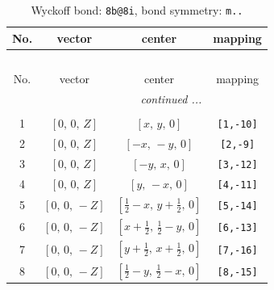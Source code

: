 \documentclass[fleqn,8pt]{jsarticle}
\begin{document}
\begin{longtable}{cccc}
\caption{Wyckoff bond: {\tt 8b@8i}, bond symmetry: {\tt m..}}
 \\
 \hline \hline
No. & vector & center & mapping \\ \hline \endfirsthead

\multicolumn{3}{l}{\tablename\ \thetable{}} \\
 \hline \hline
No. & vector & center & mapping \\ \hline \endhead

 \hline \hline
\multicolumn{3}{r}{\footnotesize\it continued ...} \\ \endfoot

 \hline \hline
\multicolumn{3}{r}{} \\ \endlastfoot

1 & $\left[ 0,\, 0,\, Z \right]$ & $\left[ x,\, y,\, 0 \right]$ & {\tt [1,-10]} \\ \hline
2 & $\left[ 0,\, 0,\, Z \right]$ & $\left[ - x,\, - y,\, 0 \right]$ & {\tt [2,-9]} \\ \hline
3 & $\left[ 0,\, 0,\, Z \right]$ & $\left[ - y,\, x,\, 0 \right]$ & {\tt [3,-12]} \\ \hline
4 & $\left[ 0,\, 0,\, Z \right]$ & $\left[ y,\, - x,\, 0 \right]$ & {\tt [4,-11]} \\ \hline
5 & $\left[ 0,\, 0,\, - Z \right]$ & $\left[ \frac{1}{2} - x,\, y + \frac{1}{2},\, 0 \right]$ & {\tt [5,-14]} \\ \hline
6 & $\left[ 0,\, 0,\, - Z \right]$ & $\left[ x + \frac{1}{2},\, \frac{1}{2} - y,\, 0 \right]$ & {\tt [6,-13]} \\ \hline
7 & $\left[ 0,\, 0,\, - Z \right]$ & $\left[ y + \frac{1}{2},\, x + \frac{1}{2},\, 0 \right]$ & {\tt [7,-16]} \\ \hline
8 & $\left[ 0,\, 0,\, - Z \right]$ & $\left[ \frac{1}{2} - y,\, \frac{1}{2} - x,\, 0 \right]$ & {\tt [8,-15]} \\
\end{longtable}
\renewcommand{\arraystretch}{1.2}
\end{document}

